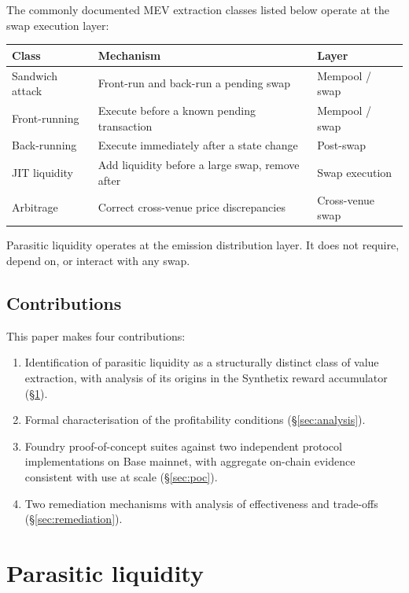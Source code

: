 \documentclass[11pt,a4paper]{article}
\theoremstyle{definition}
\begin{document}
The commonly documented MEV extraction classes listed below operate at the swap execution layer:

\begin{table}[H]
\centering
\begin{tabular}{@{}lll@{}}
\toprule
Class & Mechanism & Layer \\
\midrule
Sandwich attack & Front-run and back-run a pending swap & Mempool / swap \\
Front-running & Execute before a known pending transaction & Mempool / swap \\
Back-running & Execute immediately after a state change & Post-swap \\
JIT liquidity & Add liquidity before a large swap, remove after & Swap execution \\
Arbitrage & Correct cross-venue price discrepancies & Cross-venue swap \\
\bottomrule
\end{tabular}
\end{table}

Parasitic liquidity operates at the emission distribution layer. It does not require, depend on, or interact with any swap.

\subsection{Contributions}\label{sec:contributions}

This paper makes four contributions:

\begin{enumerate}[leftmargin=2em]
\item Identification of parasitic liquidity as a structurally distinct class of value extraction, with analysis of its origins in the Synthetix reward accumulator (\S\ref{sec:definition}).
\item Formal characterisation of the profitability conditions (\S\ref{sec:analysis}).
\item Foundry proof-of-concept suites against two independent protocol implementations on Base mainnet, with aggregate on-chain evidence consistent with use at scale (\S\ref{sec:poc}).
\item Two remediation mechanisms with analysis of effectiveness and trade-offs (\S\ref{sec:remediation}).
\end{enumerate}

\section{Parasitic liquidity}\label{sec:definition}
\end{document}
